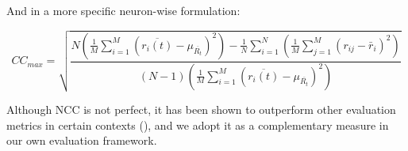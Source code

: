 And in a more specific neuron-wise formulation:

\begin{equation}
    CC_{max} = \sqrt{\frac{
        N \left( \frac{1}{M} \sum_{i=1}^{M} 
        (\overline{r_i(t)} - \mu_{\overline{R_t}})^2 \right)
        - \frac{1}{N} \sum_{i=1}^{N} \left( \frac{1}{M} \sum_{j=1}^{M} (r_{ij} - \bar{r}_i)^2 \right)
    }{(N-1) \left( \frac{1}{M} \sum_{i=1}^{M} (\overline{r_i(t)} - \mu_{\overline{R_t}})^2 \right)}}
\end{equation}
\label{eq:cc_max_neurons}

Although NCC is not perfect, it has been shown to outperform other evaluation metrics in certain contexts (\citet{schoppe_measuring_2016, pospisil2021eval}), and we adopt it as a complementary measure in our own evaluation framework.